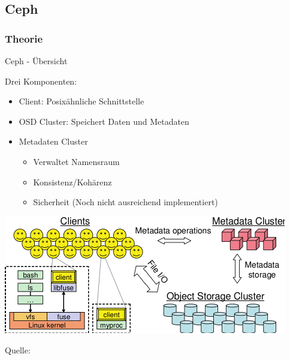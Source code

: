 \documentclass[hyperref={xetex}]{beamer}
\begin{document}
\subsection{Ceph}


\subsubsection{Theorie}

\begin{frame}{Ceph - \"Ubersicht}
	
	Drei Komponenten:
	\begin{itemize}
		\item Client: Posix\"ahnliche Schnittstelle %
		\item OSD Cluster: Speichert Daten und Metadaten
		\item Metadaten Cluster
			\begin{itemize}
				\item Verwaltet Namensraum
				\item Konsistenz/Koh\"arenz
				\item Sicherheit (Noch nicht ausreichend implementiert)
			\end{itemize}
	\end{itemize}
\end{frame}

\begin{frame}
	\begin{center}
		\includegraphics{images/ceph_architecture.pdf}
	\end{center}
	Quelle: \cite{weil2006}
\end{frame}
\end{document}
